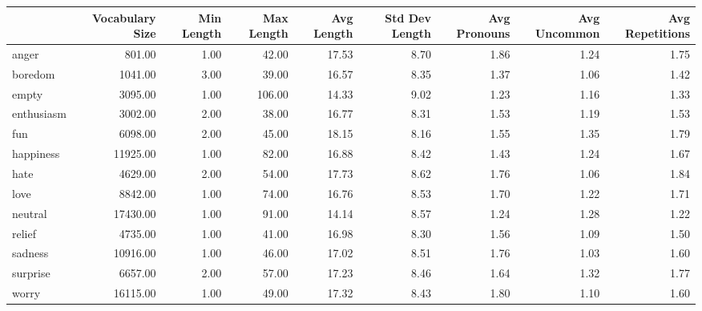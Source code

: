 \begin{tabular}{lrrrrrrrr}
\toprule
 & Vocabulary Size & Min Length & Max Length & Avg Length & Std Dev Length & Avg Pronouns & Avg Uncommon & Avg Repetitions \\
\midrule
anger & 801.00 & 1.00 & 42.00 & 17.53 & 8.70 & 1.86 & 1.24 & 1.75 \\
boredom & 1041.00 & 3.00 & 39.00 & 16.57 & 8.35 & 1.37 & 1.06 & 1.42 \\
empty & 3095.00 & 1.00 & 106.00 & 14.33 & 9.02 & 1.23 & 1.16 & 1.33 \\
enthusiasm & 3002.00 & 2.00 & 38.00 & 16.77 & 8.31 & 1.53 & 1.19 & 1.53 \\
fun & 6098.00 & 2.00 & 45.00 & 18.15 & 8.16 & 1.55 & 1.35 & 1.79 \\
happiness & 11925.00 & 1.00 & 82.00 & 16.88 & 8.42 & 1.43 & 1.24 & 1.67 \\
hate & 4629.00 & 2.00 & 54.00 & 17.73 & 8.62 & 1.76 & 1.06 & 1.84 \\
love & 8842.00 & 1.00 & 74.00 & 16.76 & 8.53 & 1.70 & 1.22 & 1.71 \\
neutral & 17430.00 & 1.00 & 91.00 & 14.14 & 8.57 & 1.24 & 1.28 & 1.22 \\
relief & 4735.00 & 1.00 & 41.00 & 16.98 & 8.30 & 1.56 & 1.09 & 1.50 \\
sadness & 10916.00 & 1.00 & 46.00 & 17.02 & 8.51 & 1.76 & 1.03 & 1.60 \\
surprise & 6657.00 & 2.00 & 57.00 & 17.23 & 8.46 & 1.64 & 1.32 & 1.77 \\
worry & 16115.00 & 1.00 & 49.00 & 17.32 & 8.43 & 1.80 & 1.10 & 1.60 \\
\bottomrule
\end{tabular}
